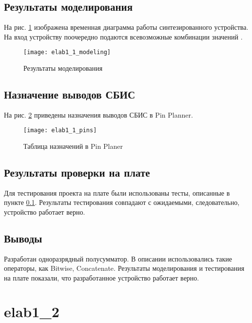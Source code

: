 \subsection{Результаты моделирования}
\label{sec:elab1_1_modeling}

На рис. \ref{fig:elab1_1_modeling} изображена временная диаграмма работы синтезированного устройства. На вход устройству поочередно подаются всевозможные комбинации значений .
\begin{figure}[H]
\begin{center}
	\texttt{[image: elab1\_1\_modeling]}
	\caption{Результаты моделирования}
	\label{fig:elab1_1_modeling}
\end{center}
\end{figure}

\subsection{Назначение выводов СБИС}

На рис. \ref{fig:elab1_1_pins} приведены назначения выводов СБИС в Pin Planner.

\begin{figure}[H]
\begin{center}
	\texttt{[image: elab1\_1\_pins]}
	\caption{Таблица назначений в Pin Planer}
	\label{fig:elab1_1_pins}
\end{center}
\end{figure}

\subsection{Результаты проверки на плате}

Для тестирования проекта на плате были использованы тесты, описанные в пункте \ref{sec:elab1_1_modeling}. Результаты тестирования совпадают с ожидаемыми, следовательно, устройство работает верно.

\subsection{Выводы}

Разработан одноразрядный полусумматор. В описании использовались такие операторы, как Bitwise, Concatenate. Результаты моделирования и тестирования на плате показали, что разработанное устройство работает верно.

\newpage

\section{elab1\_2}

